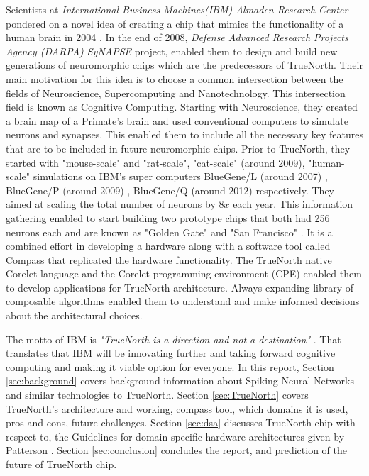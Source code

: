 \documentclass[11pt,twoside]{article}
\begin{document}
Scientists at \textit{International Business Machines(IBM) Almaden Research Center} pondered on a novel idea of creating a chip that mimics the functionality of a human brain in 2004 \cite{akopyan2015truenorth}. In the end of 2008, \textit{Defense Advanced Research Projects Agency (DARPA) SyNAPSE} project, enabled them to design and build new generations of neuromorphic chips which are the predecessors of TrueNorth. Their main motivation for this idea is to choose a common intersection between the fields of Neuroscience, Supercomputing and Nanotechnology. This intersection field is known as Cognitive Computing. Starting with Neuroscience, they created a brain map of a Primate's brain and used conventional computers to simulate neurons and synapses. This enabled them to include all the necessary key features that are to be included in future neuromorphic chips.  Prior to TrueNorth, they started with "mouse-scale" and "rat-scale", "cat-scale" (around 2009), "human-scale" simulations on IBM's super computers BlueGene/L (around 2007) \cite{ananthanarayanan2007anatomy}, BlueGene/P (around 2009) \cite{ananthanarayanan2009cat}, BlueGene/Q (around 2012) \cite{preissl2012compass} respectively. They aimed at scaling the total number of neurons by $8x$ each year. This information gathering enabled to start building two prototype chips that both had 256 neurons each and are known as "Golden Gate" and "San Francisco" \cite{arthur2012building}. It is a combined effort in developing a hardware along with a software tool called Compass that replicated the hardware functionality. The TrueNorth native Corelet language and the Corelet programming environment (CPE) enabled them to develop applications for TrueNorth architecture. Always expanding library of composable algorithms enabled them to understand and make informed decisions about the architectural choices. 
\par
The motto of IBM is \textit{"TrueNorth is a direction and not a destination"} \cite{debole2019truenorth}. That translates that IBM will be innovating further and taking forward cognitive computing and making it viable option for everyone. In this report, Section \ref{sec:background} covers background information about Spiking Neural Networks and similar technologies to TrueNorth. Section \ref{sec:TrueNorth} covers TrueNorth's architecture and working, compass tool, which domains it is used, pros and cons, future challenges. Section \ref{sec:dsa} discusses TrueNorth chip with respect to, the Guidelines for domain-specific hardware architectures given by Patterson \cite{Hennessy_Patterson_2017}. Section \ref{sec:conclusion} concludes the report, and prediction of the future of TrueNorth chip.
\end{document}

